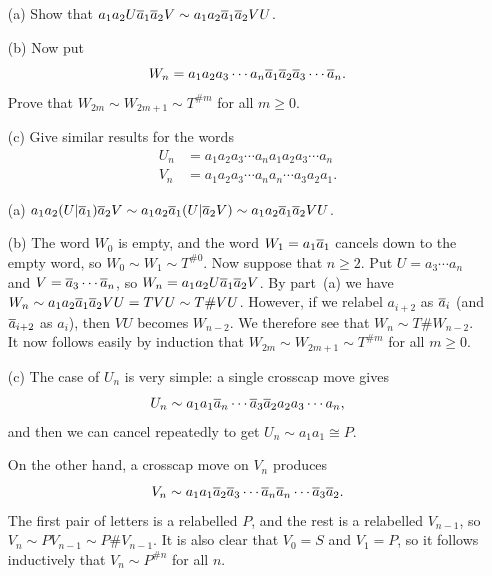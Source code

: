 \documentclass[a4paper]{amsart}
\begin{document}
\begin{exercise}\leavevmode
 \begin{itemize}
  \item[(a)] Show that $a_1a_2U\overline{a}_1\overline{a}_2V\sim a_1a_2\overline{a}_1\overline{a}_2VU$.
  \item[(b)] Now put 
   \[ W_n = a_1a_2a_3\dotsb a_n\overline{a}_1\overline{a}_2\overline{a}_3\dotsb \overline{a}_n. \]
   Prove that $W_{2m}\sim W_{2m+1}\sim T^{\# m}$ for all $m\geq 0$.
  \item[(c)] Give similar results for the words 
   \begin{align*}
    U_n &= a_1a_2a_3\dotsb a_n a_1a_2a_3\dotsb a_n \\
    V_n &= a_1a_2a_3\dotsb a_n a_n \dotsb a_3a_2a_1.
   \end{align*}
 \end{itemize}
\end{exercise}
\begin{solution}
 \begin{itemize}
  \item[(a)] 
   $a_1a_2(U|\overline{a}_1)\overline{a}_2V\sim
    a_1a_2\overline{a}_1(U|\overline{a}_2V)\sim
    a_1a_2\overline{a}_1\overline{a}_2VU$.
   \item[(b)] The word $W_0$ is empty, and the word $W_1=a_1\overline{a}_1$
    cancels down to the empty word, so $W_0\sim W_1\sim T^{\# 0}$.  
    Now suppose that $n\geq 2$.  Put $U=a_3\dotsb a_n$ and
    $V=\overline{a}_3\dotsb\overline{a}_n$, so $W_n=a_1a_2 U\overline{a}_1\overline{a}_2 V$.  By part~(a)
    we have $W_n\sim a_1a_2\overline{a}_1\overline{a}_2 VU=TVU\sim T\#VU$.  However,
    if we relabel $a_{i+2}$ as $\overline{a}_i$ (and $\overline{a}_{i+2}$ as $a_i$),
    then $VU$ becomes $W_{n-2}$.  We therefore see that
    $W_n\sim T\# W_{n-2}$.  It now follows easily by induction that
    $W_{2m}\sim W_{2m+1}\sim T^{\# m}$ for all $m\geq 0$.
   \item[(c)] The case of $U_n$ is very simple: a single crosscap move
    gives 
    \[ U_n \sim a_1a_1 \overline{a}_n\dotsb \overline{a}_3\overline{a}_2 a_2a_3\dotsb a_n, \]
    and then we can cancel repeatedly to get $U_n\sim a_1a_1\cong P$.

    On the other hand, a crosscap move on $V_n$ produces 
    \[ V_n \sim a_1a_1 \overline{a}_2\overline{a}_3\dotsb \overline{a}_n\overline{a}_n\dotsb\overline{a}_3\overline{a}_2. \]
    The first pair of letters is a relabelled $P$, and the rest is a
    relabelled $V_{n-1}$, so $V_n\sim PV_{n-1}\sim P\# V_{n-1}$.  It
    is also clear that $V_0=S$ and $V_1=P$, so it follows inductively
    that $V_n\sim P^{\# n}$ for all $n$.
 \end{itemize}
\end{solution}
\end{document}
